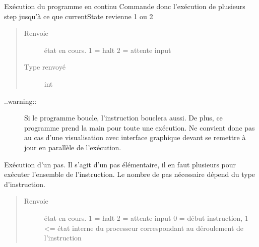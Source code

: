 \documentclass[letterpaper,10pt,french]{sphinxmanual}
\begin{document}
\begin{fulllineitems}

\begin{fulllineitems}
\label{\detokenize{executeur:executeur.Executeur.nonStopRun}}
Exécution du programme en continu
Commande donc l’exécution de plusieurs step jusqu’à ce que currentState revienne \sphinxhyphen{}1 ou \sphinxhyphen{}2
\begin{quote}\begin{description}
\item[{Renvoie}] \leavevmode
état en cours.
\sphinxhyphen{}1 = halt
\sphinxhyphen{}2 = attente input

\item[{Type renvoyé}] \leavevmode
int

\end{description}\end{quote}
\begin{description}
\item[{..warning::}] \leavevmode
Si le programme boucle, l’instruction bouclera aussi.
De plus, ce programme prend la main pour toute une exécution.
Ne convient donc pas au cas d’une visualisation avec interface graphique devant se remettre à jour en parallèle de l’exécution.

\end{description}

\end{fulllineitems}


\begin{fulllineitems}
\label{\detokenize{executeur:executeur.Executeur.step}}
Exécution d’un pas.
Il s’agit d’un pas élémentaire, il en faut plusieurs pour exécuter l’ensemble de l’instruction.
Le nombre de pas nécessaire dépend du type d’instruction.
\begin{quote}\begin{description}
\item[{Renvoie}] \leavevmode
état en cours.
\sphinxhyphen{}1 = halt
\sphinxhyphen{}2 = attente input
0 = début instruction,
1 \textless{}= état interne du processeur correspondant au déroulement de l’instruction


\end{description}
\end{quote}
\end{fulllineitems}
\end{fulllineitems}
\end{document}
